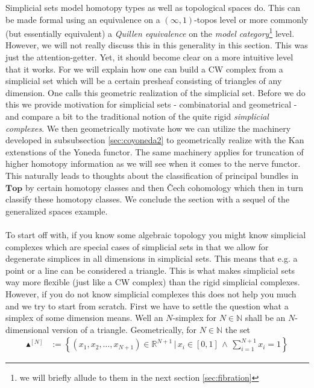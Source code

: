 Simplicial sets model homotopy types as well as topological spaces do. This can be made formal using an equivalence on a $(\infty,1)$-topos level or more commonly (but essentially equivalent) a \textit{Quillen equivalence} on the \textit{model category}\footnote{we will briefly allude to them in the next section \ref{sec:fibration}} level. However, we will not really discuss this in this generality in this section. This was just the attention-getter. Yet, it should become clear on a more intuitive level that it works. For we will explain how one can build a CW complex from a simplicial set which will be a certain presheaf consisting of {\glqq}triangles of any dimension{\grqq}. One calls this geometric realization of the simplicial set. Before we do this we provide motivation for simplicial sets - combinatorial and geometrical - and compare a bit to the traditional notion of the quite rigid \textit{simplicial complexes}. We then geometrically motivate how we can utilize the machinery developed in subsubsection \ref{sec:coyoneda2} to geometrically realize with the Kan extenstions of the Yoneda functor. The same machinery applies for truncation of higher homotopy information as we will see when it comes to the nerve functor. This naturally leads to thoughts about the classification of principal bundles in $\mathbf{Top}$ by certain homotopy classes and then \v{C}ech cohomology which then in turn classify these homotopy classes. We conclude the section with a sequel of the generalized spaces example.
\\\\
To start off with, if you know some algebraic topology you might know simplicial complexes which are special cases of simplicial sets in that we allow for degenerate simplices in all dimensions in simplicial sets. This means that e.g. a point or a line can be considered a triangle. This is what makes simplicial sets way more flexible (just like a CW complex) than the rigid simplicial complexes. However, if you do not know simplicial complexes this does not help you much and we try to start from scratch. First we have to settle the question what a simplex of some dimension means. Well an $N$-simplex for $N \in \mathbb{N}$ shall be an $N$-dimensional version of a triangle. Geometrically, for $N \in \mathbb{N}$ the set
\begin{align*}
  \blacktriangle^{[N]}
  &:=
  \left\lbrace
      (x_{1},x_{2},\ldots,x_{N+1})
      \in
      \mathbb{R}^{N+1}
    \,
    \vert
    \,
      x_{i}
      \in
      [0,1]
      \,
      \land
      \,
      \sum_{i=1}^{N+1}
      x_{i}
      =
      1
  \right\rbrace
\end{align*}
